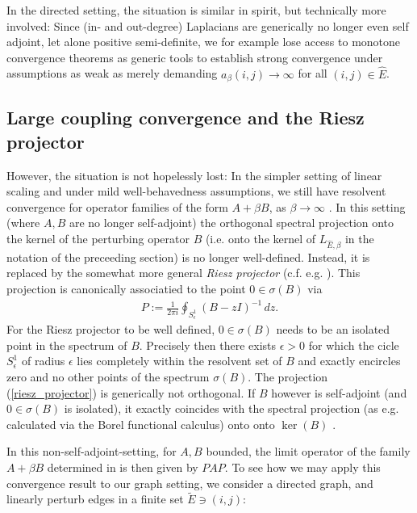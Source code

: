 \documentclass[reqno,12pt,letterpaper]{amsart}
\numberwithin{equation}{section}
\newcommand{\1}{\mathds{1}}
\theoremstyle{definition}
\begin{document}
		In the directed setting, the situation is similar in spirit, but technically more involved: Since (in- and out-degree) Laplacians are generically no longer even self adjoint, let alone positive semi-definite, we for example  lose access to monotone convergence theorems 
	 as generic tools to establish strong convergence under assumptions as weak as merely demanding $a_\beta(i,j) \rightarrow \infty$ for all $(i,j) \in \hat{E}$.




\subsection{Large coupling convergence and the Riesz projector}

However, the situation is not hopelessly lost:	In the simpler setting of linear scaling and under mild well-behavedness assumptions, we still have resolvent convergence  for operator families of the form $A + \beta B$,  as $\beta \rightarrow \infty$ \cite{koke2026coupling}.  
	In this setting (where   $A, B$ are no longer self-adjoint)  the orthogonal spectral projection 
 onto the kernel of the perturbing operator $B$  (i.e. onto the kernel of $L_{\hat{E},\beta}$ in the notation of the preceeding section) is no longer well-defined. Instead, it is replaced by the somewhat more general
	 \emph{Riesz projector} (c.f. e.g. \cite{HislopSigal1996, koke2026coupling}). This projection  is canonically associatied to the point  $0 \in \sigma(B)$ via
	\begin{align}\label{riesz_projector}
		P:= \frac{1}{2 \pi i} \oint_{S_\epsilon^1} (B - z I)^{-1} \, dz.
	\end{align}
 For the Riesz projector to be well defined,   $0 \in \sigma(B)$ needs to be an isolated point in the spectrum of $B$. Precisely then  there exists $\epsilon > 0$ for which the cicle $S_\epsilon^1$ of radius $\epsilon$ lies completely within the resolvent set of $B$ and exactly encircles zero  and no other points of the spectrum  $\sigma(B)$.
The projection (\ref{riesz_projector}) is generically not orthogonal. If $B$ however is self-adjoint  (and $0 \in \sigma(B)$ is isolated), it exactly coincides with the spectral projection (as e.g. calculated via the Borel functional calculus) onto onto $\ker(B)$ \cite{HislopSigal1996}.
\medskip

 In this non-self-adjoint-setting, for  $A,B $ bounded, the limit operator of the family $A + \beta B$ determined in \cite{koke2026coupling} is then given by $PAP$.
  To see how we may apply this convergence result
    to our graph  setting, we consider a directed graph, and linearly perturb edges in a finite set $\tilde{E} \ni (i,j)$:
 
\end{document}
